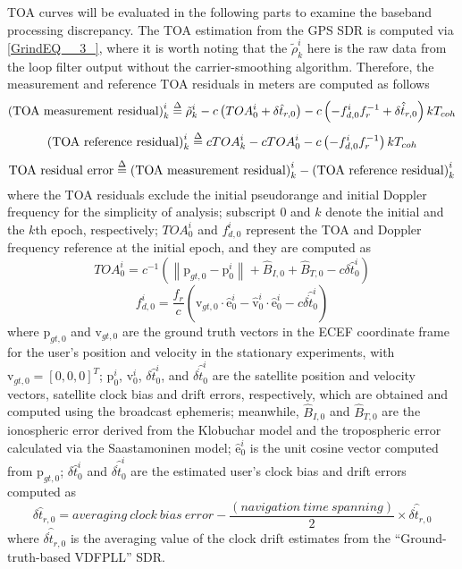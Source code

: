\documentclass{article}
\begin{document}
TOA curves will be evaluated in the following parts to examine the baseband processing discrepancy. The TOA estimation from the GPS SDR is computed via \eqref{GrindEQ__3_}, where it is worth noting that the ${\tilde{\rho }}^i_k$ here is the raw data from the loop filter output without the carrier-smoothing algorithm. Therefore, the measurement and reference TOA residuals in meters are computed as follows
\[{\left(\mathrm{TOA\ measurement\ residual}\right)}^i_k\buildrel \Delta \over ={\tilde{\rho }}^i_k-c\left({TOA}^i_0+\delta {\hat{t}}_{r,0}\right)-c\left(-f^i_{d,0}f^{-1}_r+\delta {\hat{\dot{t}}}_{r,0}\right)kT_{coh}\] 
\[{\left(\mathrm{TOA\ reference\ residual}\right)}^i_k\buildrel \Delta \over =c{TOA}^i_k-c{TOA}^i_0-c\left(-f^i_{d,0}f^{-1}_r\right)kT_{coh}\] 
\[\mathrm{TOA\ residual}\mathrm{\ error}\buildrel \Delta \over ={\left(\mathrm{TOA\ measurement\ residual}\right)}^i_k-{\left(\mathrm{TOA\ reference\ residual}\right)}^i_k\] 
where the TOA residuals exclude the initial pseudorange and initial Doppler frequency for the simplicity of analysis; subscript $0$ and $k$ denote the initial and the $k$th epoch, respectively; ${TOA}^i_0$ and $f^i_{d,0}$ represent the TOA and Doppler frequency reference at the initial epoch, and they are computed as
\[{TOA}^i_0\mathrm{=}c^{-1}\left(\left\|{\boldsymbol{\mathrm{p}}}_{gt,0}-{\boldsymbol{\mathrm{p}}}^i_0\right\|+{\hat{B}}_{I,0}+{\hat{B}}_{T,0}-c\delta {\hat{t}}^i_0\right)\] 
\[f^i_{d,0}=\frac{f_r}{c}\left({\boldsymbol{\mathrm{v}}}_{gt,0}\cdot {\hat{\boldsymbol{\mathrm{e}}}}^i_0-{\hat{\boldsymbol{\mathrm{v}}}}^i_0\cdot {\hat{\boldsymbol{\mathrm{e}}}}^i_0-c\delta {\hat{\dot{t}}}^i_0\right)\] 
where ${\boldsymbol{\mathrm{p}}}_{gt,0}$ and ${\boldsymbol{\mathrm{v}}}_{gt,0}$ are the ground truth vectors in the ECEF coordinate frame for the user's position and velocity in the stationary experiments, with ${\boldsymbol{\mathrm{v}}}_{gt,0}={\left[0,0,0\right]}^T$; ${\boldsymbol{\mathrm{p}}}^i_0$, ${\boldsymbol{\mathrm{v}}}^i_0$, $\delta {\hat{t}}^i_0$, and $\delta{\hat{\dot{t}}}^i_0$ are the satellite position and velocity vectors, satellite clock bias and drift errors, respectively, which are obtained and computed using the broadcast ephemeris; meanwhile, ${\hat{B}}_{I,0}$ and ${\hat{B}}_{T,0}$ are the ionospheric error derived from the Klobuchar model and the tropospheric error calculated via the Saastamoninen model; ${\hat{\boldsymbol{\mathrm{e}}}}^i_0$ is the unit cosine vector computed from ${\boldsymbol{\mathrm{p}}}_{gt,0}$; $\delta {\hat{t}}^i_0$ and $\delta {\hat{\dot{t}}}^i_0$ are the estimated user's clock bias and drift errors computed as
\[\delta {\hat{t}}_{r,0}=averaging\ clock\ bias\ error-\frac{\left(navigation\ time\ spanning\right)}{2}\times \delta {\hat{\dot{t}}}_{r,0}\] 
where $\delta {\hat{\dot{t}}}_{r,0}$ is the averaging value of the clock drift estimates from the ``Ground-truth-based VDFPLL'' SDR. 
\end{document}
